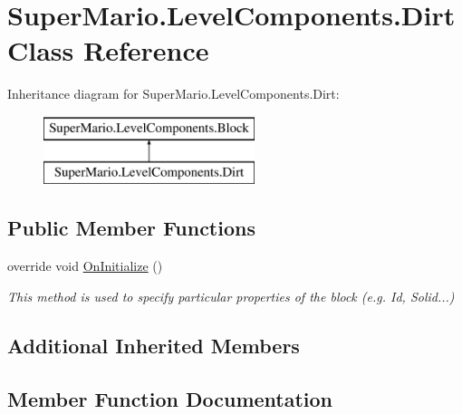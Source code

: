\hypertarget{class_super_mario_1_1_level_components_1_1_dirt}{}\section{Super\+Mario.\+Level\+Components.\+Dirt Class Reference}
\label{class_super_mario_1_1_level_components_1_1_dirt}
Inheritance diagram for Super\+Mario.\+Level\+Components.\+Dirt\+:\begin{figure}[H]
\begin{center}
\leavevmode
\includegraphics[height=2.000000cm]{class_super_mario_1_1_level_components_1_1_dirt}
\end{center}
\end{figure}
\subsection*{Public Member Functions}
\begin{DoxyCompactItemize}
\item 
override void \mbox{\hyperlink{class_super_mario_1_1_level_components_1_1_dirt_a800acb34aa293bf29cd3e4af39020633}{On\+Initialize}} ()
\begin{DoxyCompactList}\small\item\em This method is used to specify particular properties of the block (e.\+g. Id, Solid...) \end{DoxyCompactList}\end{DoxyCompactItemize}
\subsection*{Additional Inherited Members}


\subsection{Member Function Documentation}
\mbox{\label{class_super_mario_1_1_level_components_1_1_dirt_a800acb34aa293bf29cd3e4af39020633}} 
